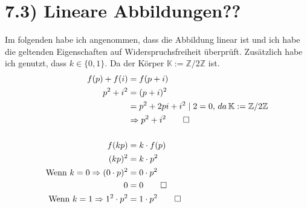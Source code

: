\documentclass[titlepage]{article}
\newcommand{\K}{\mathbb{K}}
\newcommand{\1}{\mathbb{1}}
\newcommand{\0}{\mathbb{0}}
\newcommand{\Z}{\mathbb{Z}}
\begin{document}
	\section*{7.3) Lineare Abbildungen??}
		Im folgenden habe ich angenommen, dass die Abbildung linear ist und ich habe die geltenden Eigenschaften auf Widerspruchsfreiheit überprüft. Zusätzlich habe ich genutzt, dass $k\in\{0,1\}$. Da der Körper $\K:=\Z/2\Z$ ist.
		\begin{align*}
			f(p)+f(i)&=f(p+i)\\
			p^2+i^2&=(p+i)^2\\
			&=p^2+2pi+i^2\mid2=0,\,da\,\K:=\Z/2\Z\\
			&\Rightarrow p^2+i^2\qed\\\\
			f(kp)&=k\cdot f(p)\\
			(kp)^2&=k\cdot p^2\\
			\text{Wenn $k=0$}\Rightarrow(0\cdot p)^2&=0\cdot p^2\\
			0&=0\qed\\
			\text{Wenn $k=1$}\Rightarrow1^2\cdot p^2&=1\cdot p^2\qed
		\end{align*}
\end{document}
